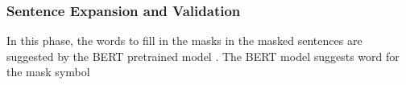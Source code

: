 
\subsubsection{Sentence Expansion and Validation}

In this phase, the words to fill in the masks in the masked sentences
are suggested by the BERT pretrained model \cite{}.  The BERT model
suggests word for the mask symbol

